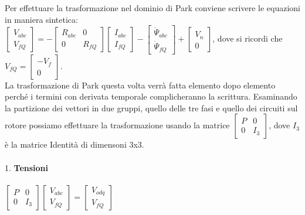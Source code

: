 \documentclass[Lau,noexaminfo]{sapthesis}
\begin{document}
	Per effettuare la trasformazione nel dominio di Park conviene scrivere le equazioni in maniera sintetica:\\
	$\begin{bmatrix}
		V_{abc}\\
		V_{fQ}
	\end{bmatrix}=-
	\begin{bmatrix}
		R_{abc} & 0\\
		0 & R_{fQ}
	\end{bmatrix}
	\begin{bmatrix}
	I_{abc}\\
	I_{fQ}
	\end{bmatrix}-
	\begin{bmatrix}
	\dot{\Psi}_{abc}\\
	\dot{\Psi}_{fQ}
	\end{bmatrix}+
	\begin{bmatrix}
	V_{n}\\
	0
	\end{bmatrix}$, dove si ricordi che\\
	$V_{fQ}=\begin{bmatrix}
	-V_{f}\\
	0
	\end{bmatrix}$.\\ La trasformazione di Park questa volta verrà fatta elemento dopo elemento perché i termini con derivata temporale complicheranno la scrittura. Esaminando la partizione dei vettori in due gruppi, quello delle tre fasi e quello dei circuiti sul rotore possiamo effettuare la trasformazione usando la matrice $\begin{bmatrix}
	P & 0\\
	0 & I_3
	\end{bmatrix}$, dove $I_3$ è la matrice Identità di dimensoni 3x3.\\\\
	1. \textbf{Tensioni}\\\\
	$\begin{bmatrix}
	P & 0\\
	0 & I_3
	\end{bmatrix}
	\begin{bmatrix}
		V_{abc}\\
		V_{fQ}
	\end{bmatrix}=
	\begin{bmatrix}
		V_{odq}\\
		V_{fQ}
	\end{bmatrix}$\\\\\\
\end{document}
